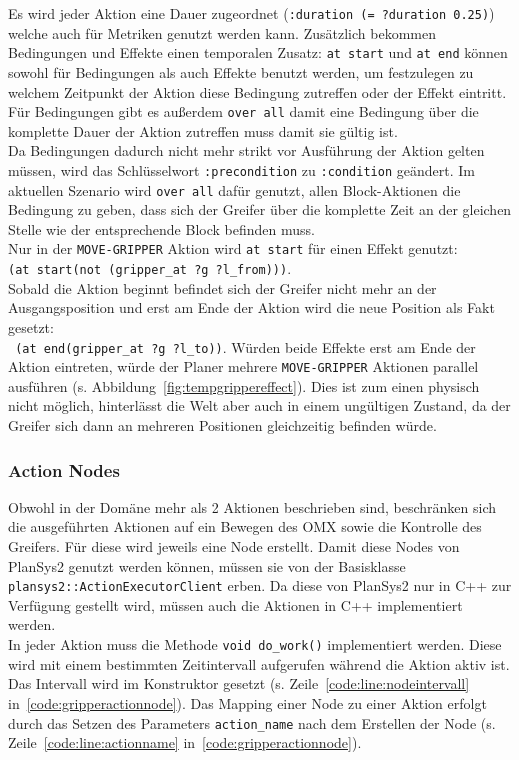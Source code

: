 Es wird jeder Aktion eine Dauer zugeordnet (\verb|:duration (= ?duration 0.25)|) welche auch für Metriken genutzt werden kann.
Zusätzlich bekommen Bedingungen und Effekte einen temporalen Zusatz: \verb|at start| und \verb|at end| können sowohl für Bedingungen als auch Effekte benutzt werden, um festzulegen zu welchem Zeitpunkt der Aktion diese Bedingung zutreffen oder der Effekt eintritt.
Für Bedingungen gibt es außerdem \verb|over all| damit eine Bedingung über die komplette Dauer der Aktion zutreffen muss damit sie gültig ist.\\
Da Bedingungen dadurch nicht mehr strikt vor Ausführung der Aktion gelten müssen, wird das Schlüsselwort \verb|:precondition| zu \verb|:condition| geändert.
Im aktuellen Szenario wird \verb|over all| dafür genutzt, allen Block-Aktionen die Bedingung zu geben, dass sich der Greifer über die komplette Zeit an der gleichen Stelle wie der entsprechende Block befinden muss.\\
Nur in der \verb|MOVE-GRIPPER| Aktion wird \verb|at start| für einen Effekt genutzt:\\
\verb|(at start(not (gripper_at ?g ?l_from)))|.\\
Sobald die Aktion beginnt befindet sich der Greifer nicht mehr an der Ausgangsposition und erst am Ende der Aktion wird die neue Position als Fakt gesetzt:\\
\verb| (at end(gripper_at ?g ?l_to))|.
Würden beide Effekte erst am Ende der Aktion eintreten, würde der Planer mehrere \verb|MOVE-GRIPPER| Aktionen parallel ausführen (s. Abbildung~\ref{fig:tempgrippereffect}).
Dies ist zum einen physisch nicht möglich, hinterlässt die Welt aber auch in einem ungültigen Zustand, da der Greifer sich dann an mehreren Positionen gleichzeitig befinden würde.

\subsubsection{Action Nodes}
Obwohl in der Domäne mehr als 2 Aktionen beschrieben sind, beschränken sich die ausgeführten Aktionen auf ein Bewegen des OMX sowie die Kontrolle des Greifers.
Für diese wird jeweils eine Node erstellt.
Damit diese Nodes von \ac{PlanSys2} genutzt werden können, müssen sie von der Basisklasse \verb|plansys2::ActionExecutorClient| erben.
Da diese von \ac{PlanSys2} nur in C++ zur Verfügung gestellt wird, müssen auch die Aktionen in C++ implementiert werden.\\
In jeder Aktion muss die Methode \verb|void do_work()| implementiert werden.
Diese wird mit einem bestimmten Zeitintervall aufgerufen während die Aktion aktiv ist.
Das Intervall wird im Konstruktor gesetzt (s. Zeile~\ref{code:line:nodeintervall} in~\ref{code:gripperactionnode}).
Das Mapping einer Node zu einer Aktion erfolgt durch das Setzen des Parameters \verb|action_name| nach dem Erstellen der Node (s. Zeile~\ref{code:line:actionname} in~\ref{code:gripperactionnode}).

